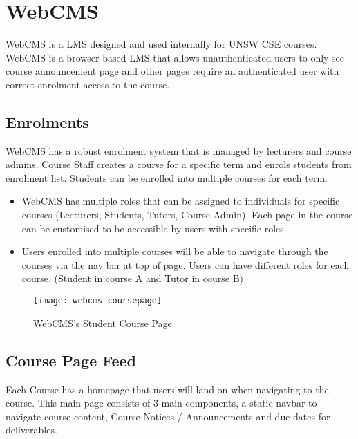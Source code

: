 \section{WebCMS}

WebCMS is a LMS designed and used internally for UNSW CSE courses. WebCMS is a browser based LMS that allows unauthenticated users to only see course announcement page and other pages require an authenticated user with correct enrolment access to the course.

\subsection{Enrolments}
WebCMS has a robust enrolment system that is managed by lecturers and course admins. Course Staff creates a course for a specific term and enrols students from enrolment list. Students can be enrolled into multiple courses for each term.

\begin{itemize}
	\item WebCMS has multiple roles that can be assigned to individuals for specific courses (Lecturers, Students, Tutors, Course Admin). Each page in the course can be customised to be accessible by users with specific roles.
	\item Users enrolled into multiple courses will be able to navigate through the courses via the nav bar at top of page. Users can have different roles for each course. (Student in course A and Tutor in course B)
\end{itemize}

\newpage

\begin{figure}[h!]
    \centering
    \texttt{[image: webcms-coursepage]}
    \caption{WebCMS's Student Course Page}
\end{figure}

\subsection{Course Page Feed}
Each Course has a homepage that users will land on when navigating to the course. This main page consists of 3 main components, a static navbar to navigate course content, Course Notices / Announcements and due dates for deliverables.

